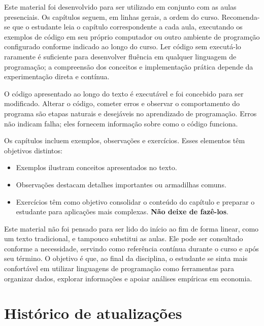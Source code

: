 \documentclass[
  brazilian,
  letterpaper,
  DIV=11,
  numbers=noendperiod]{scrreprt}
\begin{document}

Este material foi desenvolvido para ser utilizado em conjunto com as
aulas presenciais. Os capítulos seguem, em linhas gerais, a ordem do
curso. Recomenda-se que o estudante leia o capítulo correspondente a
cada aula, executando os exemplos de código em seu próprio computador ou
outro ambiente de programção configurado conforme indicado ao longo do
curso. Ler código sem executá-lo raramente é suficiente para desenvolver
fluência em qualquer linguagem de programação; a compreensão dos
conceitos e implementação prática depende da experimentação direta e
contínua.

O código apresentado ao longo do texto é executável e foi concebido para
ser modificado. Alterar o código, cometer erros e observar o
comportamento do programa são etapas naturais e desejáveis no
aprendizado de programação. Erros não indicam falha; eles fornecem
informação sobre como o código funciona.

Os capítulos incluem exemplos, observações e exercícios. Esses elementos
têm objetivos distintos:

\begin{itemize}
\item
  Exemplos ilustram conceitos apresentados no texto.
\item
  Observações destacam detalhes importantes ou armadilhas comuns.
\item
  Exercícios têm como objetivo consolidar o conteúdo do capítulo e
  preparar o estudante para aplicações mais complexas. \textbf{Não deixe
  de fazê-los}.
\end{itemize}

Este material não foi pensado para ser lido do início ao fim de forma
linear, como um texto tradicional, e tampouco substitui as aulas. Ele
pode ser consultado conforme a necessidade, servindo como referência
contínua durante o curso e após seu término. O objetivo é que, ao final
da disciplina, o estudante se sinta mais confortável em utilizar
linguagens de programação como ferramentas para organizar dados,
explorar informações e apoiar análises empíricas em economia.

\section*{Histórico de
atualizações}\label{histuxf3rico-de-atualizauxe7uxf5es}

\end{document}
